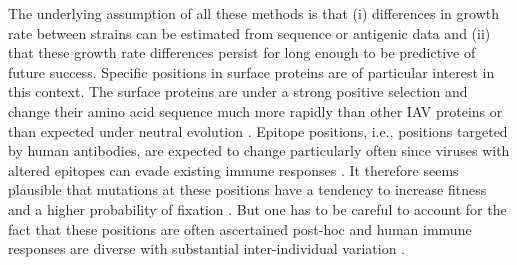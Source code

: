\documentclass[reprint,amsmath,amssymb,superscriptaddress,showpacs,rmp]{revtex4-1}
\begin{document}
	The underlying assumption of all these methods is that (i) differences in growth rate between strains can be estimated from sequence or antigenic data and (ii) that these growth rate differences persist for long enough to be predictive of future success.
	Specific positions in surface proteins are of particular interest in this context.
	The surface proteins are under a strong positive selection and change their amino acid sequence much more rapidly than other IAV proteins or than expected under neutral evolution \citep{bhatt_genomic_2011,strelkowa_clonal_2012}.
	Epitope positions, i.e., positions targeted by human antibodies, are expected to change particularly often since viruses with altered epitopes can evade existing immune responses \citep{Koel976,wolf_long_2006,Shih6283}.
    It therefore seems plausible that mutations at these positions have a tendency to increase fitness and a higher probability of fixation \citep{strelkowa_clonal_2012}.
    But one has to be careful to account for the fact that these positions are often ascertained post-hoc \citep{Shih6283} and human immune responses are diverse with substantial inter-individual variation
    \citep{lee_mapping_2019}.
\end{document}
